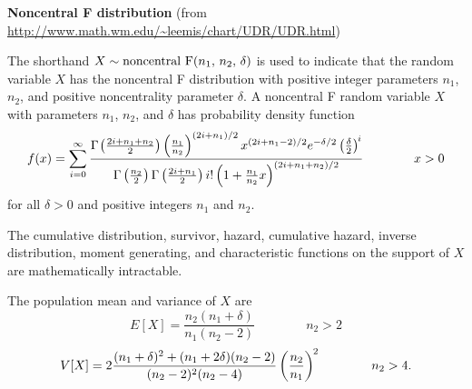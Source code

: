 \documentclass[12pt,fullpage]{article}
\begin{document}
\noindent
{\bf Noncentral F distribution} (from \color{blue}\url{http://www.math.wm.edu/~leemis/chart/UDR/UDR.html}\color{black})

\noindent
The shorthand $X \sim {\rm noncentral\ F}(n_1,\, n_2,\, \delta)$ is used to indicate that the
random variable $X$ has the noncentral F distribution with positive integer parameters $n_1$, $n_2$,
and positive noncentrality parameter $\delta$.
A noncentral F random variable $X$ with parameters $n_1$, $n_2$, and $\delta$ has probability density function 
$$
f(x) = \displaystyle\sum_{i = 0} ^ {\infty} \frac{\Gamma \kern -0.08 em \left(\frac{2i + n_1 + n_2} {2} \right) \left(\frac{n_1} {n_2} \right)
 ^ {(2i + n_1) / 2} x ^ {(2i + n_1 - 2) / 2} e ^ {-\delta / 2} \left(\frac{\delta} {2} \right) ^ {\kern -0.08 em i}} {\Gamma \left(\frac{n_2} {2} \right) \Gamma \left(\frac{2i + n_1} {2} \right) i! \left(1 + \frac{n_1} {n_2} x \right) ^ {(2i + n_1 + n_2) / 2}} \qquad \qquad x > 0
$$
for all $\delta > 0$ and positive integers $n_1$ and $n_2$.

\vspace{0.1in}
\noindent
The cumulative distribution, survivor, hazard, 
cumulative hazard, inverse distribution, moment generating, and characteristic functions on the support 
of $X$ are mathematically intractable.

\vspace{0.1in}
\noindent
The population mean and variance of $X$ are 
$$
E[X] = \frac{n_2 (n_1 + \delta)} {n_1(n_2 - 2)} \qquad \qquad n_2 > 2  
$$
$$
V[X] = 2 \frac{(n_1 + \delta) ^ 2 + (n_1 + 2\delta) (n_2 - 2)}{(n_2 - 2) ^ 2(n_2 - 4)}
\left(\frac{n_2} {n_1} \right) ^ {\kern -0.08 em 2}\qquad \qquad  n_2 > 4. 
$$

\vspace{0.1in}

\end{document}
